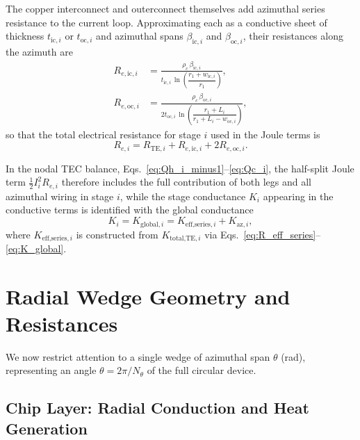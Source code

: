 \documentclass[conference]{IEEEtran}
\begin{document}
The copper interconnect and outerconnect themselves add azimuthal series resistance to the current loop. Approximating each as a conductive sheet of thickness $t_{\text{ic},i}$ or $t_{\text{oc},i}$ and azimuthal spans $\beta_{\text{ic},i}$ and $\beta_{\text{oc},i}$, their resistances along the azimuth are
\begin{align}
	R_{e,\text{ic},i} &= \frac{\rho_c \, \beta_{\text{ic},i}}{t_{\text{ic},i} \, \ln\!\left( \dfrac{r_1 + w_{\text{ic},i}}{r_1} \right)},
	\label{eq:R_e_ic_stage}\\
	R_{e,\text{oc},i} &= \frac{\rho_c \, \beta_{\text{oc},i}}{2 t_{\text{oc},i} \, \ln\!\left( \dfrac{r_1 + L_i}{r_1 + L_i - w_{\text{oc},i}} \right)},
	\label{eq:R_e_oc_stage}
\end{align}
so that the total electrical resistance for stage $i$ used in the Joule terms is
\begin{equation}
	R_{e,i} = R_{\text{TE},i} + R_{e,\text{ic},i} + 2 R_{e,\text{oc},i}.
	\label{eq:R_e_stage_i}
\end{equation}

In the nodal TEC balance, Eqs.~\eqref{eq:Qh_i_minus1}--\eqref{eq:Qc_i}, the half-split Joule term $\tfrac{1}{2} I_i^2 R_{e,i}$ therefore includes the full contribution of both legs and all azimuthal wiring in stage $i$, while the stage conductance $K_i$ appearing in the conductive terms is identified with the global conductance
\begin{equation}
	K_i = K_{\text{global},i}
	= K_{\text{eff,series},i} + K_{\text{az},i},
\end{equation}
where $K_{\text{eff,series},i}$ is constructed from $K_{\text{total,TE},i}$ via Eqs.~\eqref{eq:R_eff_series}--\eqref{eq:K_global}.

\section{Radial Wedge Geometry and Resistances}

We now restrict attention to a single wedge of azimuthal span $\theta$ (rad), representing an angle $\theta = 2\pi/N_\theta$ of the full circular device.

\subsection{Chip Layer: Radial Conduction and Heat Generation}
\end{document}
